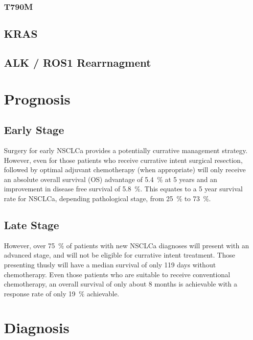 \subsubsection{T790M}

\subsection{KRAS}

\subsection{ALK / ROS1 Rearrnagment}

\section{Prognosis}

\subsection{Early Stage}
Surgery for early NSCLCa provides a potentially currative management strategy. However, even for those patients who receive currative intent surgical resection, followed by optimal adjuvant chemotherapy (when appropriate) will only receive an absolute overall survival (OS) advantage of 5.4~\% at 5 years and an improvement in disease free survival of 5.8~\%\supercite{Pignon:2008ep}. This equates to a 5 year survival rate for NSCLCa, depending pathological stage, from 25~\% to 73~\%\supercite{FRCS:2011ip}.

\subsection{Late Stage}
However, over 75~\% of patients with new NSCLCa diagnoses will present with an advanced stage\supercite{Slatore:2011hf}, and will not be eligible for currative intent treatment. Those presenting thusly will have a median survival of only 119 days\supercite{Rapp:1988uh} without chemotherapy. Even those patients who are suitable to receive conventional chemotherapy, an overall survival of only about 8 months is achievable with a response rate of only 19~\% achievable\supercite{Schiller:2002gi}.

\section{Diagnosis}


